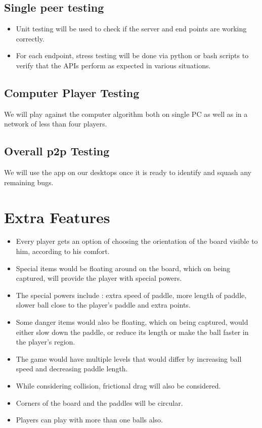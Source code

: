\documentclass{article}
\begin{document}
			\subsection{Single peer testing}
				\begin{itemize}
					\item Unit testing will be used to check if the server and end points are working correctly.
					\item For each endpoint, stress testing will be done via python or bash scripts to verify that the APIs perform as expected in various situations.
				\end{itemize}

			\subsection{Computer Player Testing}
			We will play against the computer algorithm both on single PC as well as in a network of less than four players.
			\subsection{Overall p2p Testing}
				We will use the app on our desktops once it is ready to identify and squash any remaining bugs.
	\section{Extra Features}
	\begin{itemize}
	\item Every player gets an option of choosing the orientation of the board visible to him, according to his comfort.
	\item Special items would be floating around on the board, which on being captured, will provide the player with special powers.
	\item The special powers include : extra speed of paddle, more length of paddle, slower ball close to the player's paddle and extra points.
	\item Some danger items would also be floating, which on being captured, would either slow down the paddle, or reduce its length or make the ball faster in the player's region.
	\item The game would have multiple levels that would differ by increasing ball speed and decreasing paddle length.
	\item While considering collision, frictional drag will also be considered.
	\item Corners of the board and the paddles will be circular.
	\item Players can play with more than one balls also.
	\end{itemize}
\end{document}
